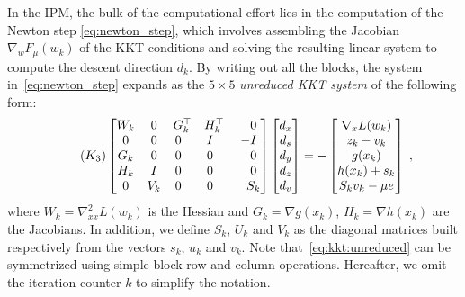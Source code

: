 In the IPM, the bulk of the computational effort lies in the computation of the Newton
step \eqref{eq:newton_step}, which involves assembling the Jacobian
$\nabla_w F_\mu(w_k)$ of the KKT conditions and solving the resulting linear system to compute
the descent direction $d_k$.
By writing out all the blocks, the system in~\eqref{eq:newton_step} expands as the $5 \times 5$
\emph{unreduced KKT system} of the following form:
\begin{equation}
  \label{eq:kkt:unreduced}
  \setlength\arraycolsep{5pt}
  \tag{$K_3$}
  \begin{bmatrix}
    W_k & 0   & G_k^\top         & H_k^\top         & \phantom{-}0 \\
    0   & 0   & 0\phantom{^\top} & I\phantom{^\top} & -I           \\
    G_k & 0   & 0\phantom{^\top} & 0\phantom{^\top} & \phantom{-}0 \\
    H_k & I   & 0\phantom{^\top} & 0\phantom{^\top} & \phantom{-}0 \\
    0   & V_k & 0\phantom{^\top} & 0\phantom{^\top} & \phantom{-}S_k
  \end{bmatrix}
  \begin{bmatrix}
    d_x \\
    d_s \\
    d_y \\
    d_z \\
    d_v
  \end{bmatrix}
  = - \begin{bmatrix}
    \nabla_x L(w_k) \\
       z_k - v_k  \\
       g(x_k)  \\
       h(x_k) + s_k  \\
       S_k v_k - \mu e
  \end{bmatrix} \; ,
\end{equation}
where $W_k = \nabla^2_{x x} L(w_k)$ is the Hessian and
$G_k = \nabla g(x_k)$, $H_k = \nabla h(x_k)$ are the Jacobians.
In addition, we define $S_k$, $U_k$ and $V_k$ as the diagonal matrices built respectively
from the vectors $s_k$, $u_k$ and $v_k$.
Note that~\eqref{eq:kkt:unreduced} can be symmetrized using simple block row and column operations.
Hereafter, we omit the iteration counter $k$ to simplify the notation.

